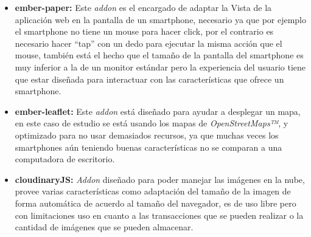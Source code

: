 \begin{itemize}
\item \textbf{ember-paper:} Este \emph{addon} es el encargado de adaptar la Vista de la aplicación web en la pantalla de un smartphone, necesario ya que por ejemplo el smartphone no tiene un mouse para hacer click, por el contrario es necesario hacer “tap” con un dedo para ejecutar la misma acción que el mouse, también está el hecho que el tamaño de la pantalla del smartphone es muy inferior a la de un monitor estándar pero la experiencia del usuario tiene que estar diseñada para interactuar con las características que ofrece un smartphone.

\item \textbf{ember-leaflet:} Este \emph{addon} está diseñado para ayudar a desplegar un mapa, en este caso de estudio se está usando los mapas de \emph{OpenStreetMaps™}, y optimizado para no usar demasiados recursos, ya que muchas veces los smartphones aún teniendo buenas características no se comparan a una computadora de escritorio.

  \item \textbf{cloudinaryJS:} \emph{Addon} diseñado para poder manejar las imágenes en la nube, provee varias características como adaptación del tamaño de la imagen de forma automática de acuerdo al tamaño del navegador, es de uso libre pero con limitaciones uso en cuanto a las transacciones que se pueden realizar o la cantidad de imágenes que se pueden almacenar.

\end{itemize}



